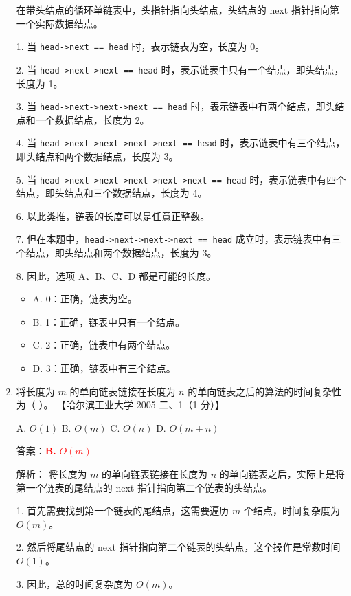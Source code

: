 \documentclass[lang=cn,newtx,10pt,scheme=chinese]{../../../elegantbook}
\begin{document}
\begin{enumerate}
        在带头结点的循环单链表中，头指针指向头结点，头结点的 next 指针指向第一个实际数据结点。

        1. 当 \texttt{head->next == head} 时，表示链表为空，长度为 0。

        2. 当 \texttt{head->next->next == head} 时，表示链表中只有一个结点，即头结点，长度为 1。

        3. 当 \texttt{head->next->next->next == head} 时，表示链表中有两个结点，即头结点和一个数据结点，长度为 2。

        4. 当 \texttt{head->next->next->next->next == head} 时，表示链表中有三个结点，即头结点和两个数据结点，长度为 3。

        5. 当 \texttt{head->next->next->next->next->next == head} 时，表示链表中有四个结点，即头结点和三个数据结点，长度为 4。

        6. 以此类推，链表的长度可以是任意正整数。

        7. 但在本题中，\texttt{head->next->next->next == head} 成立时，表示链表中有三个结点，即头结点和两个数据结点，长度为 3。

        8. 因此，选项 A、B、C、D 都是可能的长度。

        \begin{itemize}
            \item A. 0：正确，链表为空。
            \item B. 1：正确，链表中只有一个结点。
            \item C. 2：正确，链表中有两个结点。
            \item D. 3：正确，链表中有三个结点。
        \end{itemize}
        \item 将长度为 $m$ 的单向链表链接在长度为 $n$ 的单向链表之后的算法的时间复杂性为（ ）。  
    【哈尔滨工业大学 2005 二、1（1 分）】 

    A. $O(1)$ \quad B. $O(m)$ \quad C. $O(n)$ \quad D. $O(m+n)$  

        答案：\textcolor{red}{\textbf{B.} $O(m)$}

        解析：
        将长度为 $m$ 的单向链表链接在长度为 $n$ 的单向链表之后，实际上是将第一个链表的尾结点的 next 指针指向第二个链表的头结点。

        1. 首先需要找到第一个链表的尾结点，这需要遍历 $m$ 个结点，时间复杂度为 $O(m)$。

        2. 然后将尾结点的 next 指针指向第二个链表的头结点，这个操作是常数时间 $O(1)$。

        3. 因此，总的时间复杂度为 $O(m)$。


\end{enumerate}
\end{document}

